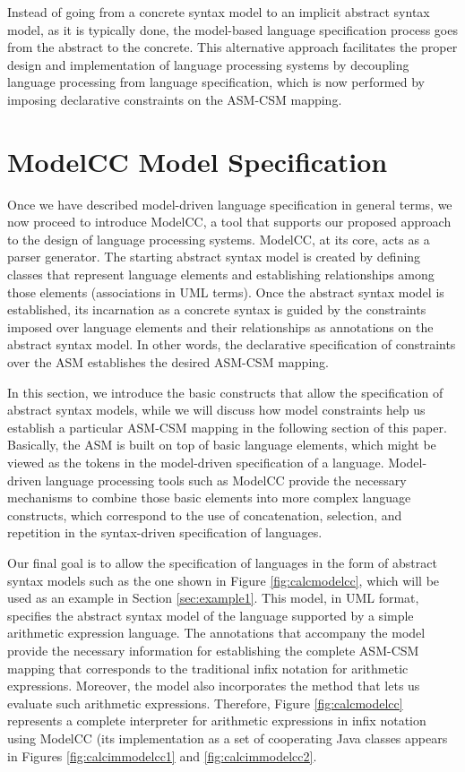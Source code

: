 \documentclass[preprint]{elsarticle}
\begin{document}
Instead of going from a concrete syntax model to an implicit abstract syntax model, as it is typically done, the model-based language specification process goes from the abstract to the concrete.
This alternative approach facilitates the proper design and implementation of language processing systems by decoupling language processing from language specification, which is now performed by imposing declarative constraints on the ASM-CSM mapping.

\section{ModelCC Model Specification} \label{sec:modelspecification}

Once we have described model-driven language specification in general terms, we now proceed to introduce ModelCC, a tool that supports our proposed approach to the design of language processing systems.
ModelCC, at its core, acts as a parser generator.
The starting abstract syntax model is created by defining classes that represent language elements and establishing relationships among those elements (associations in UML terms).
Once the abstract syntax model is established, its incarnation as a concrete syntax is guided by the constraints imposed over language elements and their relationships as annotations on the abstract syntax model.
In other words, the declarative specification of constraints over the ASM establishes the desired ASM-CSM mapping.

In this section, we introduce the basic constructs that allow the specification of abstract syntax models, while we will discuss how model constraints help us establish a particular ASM-CSM mapping in the following section of this paper.
Basically, the ASM is built on top of basic language elements, which might be viewed as the tokens in the model-driven specification of a language.
Model-driven language processing tools such as ModelCC provide the necessary mechanisms to combine those basic elements into more complex language constructs, which correspond to the use of concatenation, selection, and repetition in the syntax-driven specification of languages.

Our final goal is to allow the specification of languages in the form of abstract syntax models such as the one shown in Figure \ref{fig:calcmodelcc}, which will be used as an example in Section \ref{sec:example1}.
This model, in UML format, specifies the abstract syntax model of the language supported by a simple arithmetic expression language.
The annotations that accompany the model provide the necessary information for establishing the complete ASM-CSM mapping that corresponds to the traditional infix notation for arithmetic expressions.
Moreover, the model also incorporates the method that lets us evaluate such arithmetic expressions.
Therefore, Figure \ref{fig:calcmodelcc} represents a complete interpreter for arithmetic expressions in infix notation using ModelCC (its implementation as a set of cooperating Java classes appears in Figures \ref{fig:calcimmodelcc1} and \ref{fig:calcimmodelcc2}.
\end{document}
